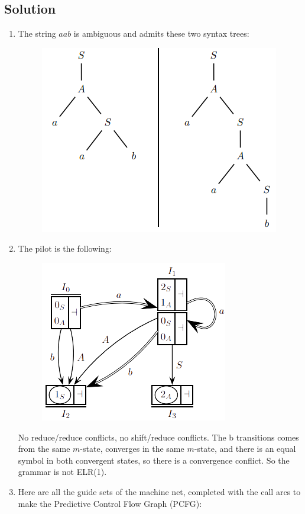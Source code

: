 \documentclass[12pt, a4paper]{report}
\newtheorem[style=M, bodystyle=\normalfont]{theorem}{Theorem}
\newtheorem[style=M, bodystyle=\normalfont]{corollary}{Corollary}
\newtheorem[style=M, bodystyle=\normalfont]{lemma}{Lemma}
\newtheorem[style=M, bodystyle=\normalfont]{definition}{Definition}
\begin{document}
    \subsection*{Solution}
        \begin{enumerate}
            \item The string $a a b$ is ambiguous and admits these two syntax trees:
                \begin{figure}[H]
                    \centering
                    \includegraphics[width=0.5\linewidth]{images/syntax.png}
                \end{figure} 
            \item The pilot is the following: 
                \begin{figure}[H]
                    \centering
                    \includegraphics[width=0.5\linewidth]{images/synsol.png}
                \end{figure} 
                No reduce/reduce conflicts, no shift/reduce conflicts. The b transitions comes from the same $m$-state, converges in the same $m$-state, and there is 
                an equal symbol in both convergent states, so there is a convergence conflict. So the grammar is not ELR(1). 
            \item Here are all the guide sets of the machine net, completed with the call arcs to make the Predictive Control Flow Graph (PCFG):
                \begin{figure}[H]

\end{figure}
\end{enumerate}
\end{document}
